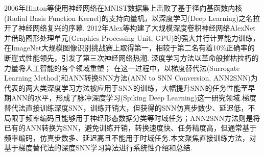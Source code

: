 \documentclass{SCIS2020cn}
\begin{document}
2006年Hinton等\cite{10.1162/neco.2006.18.7.1527}使用神经网络在MNIST数据集\cite{MNIST}上击败了基于径向基函数内核(Radial Basis Function Kernel)的支持向量机，以深度学习(Deep Learning)之名拉开了神经网络复兴的序幕\cite{Goodfellow-et-al-2016}.
2012年Alex等\cite{NIPS2012_c399862d}构建了大规模深度卷积神经网络AlexNet并借助图形处理单元(Graphics Processing Unit, GPU)的强大并行计算能力训练，在ImageNet大规模图像识别挑战赛\cite{russakovsky2015imagenet}上取得第一，相较于第二名有着10\%正确率的断崖式性能领先，引发了第三次神经网络热潮.
深度学习方法以革命般摧枯拉朽的力量将人工智能的各个领域重塑；%
在这一过程中，以梯度替代法(Surrogate Learning Method)\cite{neftci2019surrogate}和ANN转换SNN方法(ANN to SNN Conversion, ANN2SNN)\cite{cao2015spiking}为代表的两大类深度学习方法被应用于SNN的训练，大幅提升SNN的任务性能至早期ANN的水平\cite{TAVANAEI201947}，形成了脉冲深度学习(Spiking Deep Learning)这一研究领域.梯度替代法直接训练深度SNN，训练开销大，但获得的SNN仿真步数少、延迟低，不局限于频率编码且能够用于神经形态数据分类等时域任务；ANN2SNN方法则是将已有的ANN转换为SNN，避免训练开销，转换速度快、任务精度高，但通常基于频率编码，仿真步数多、延迟高且不能用于时域任务.本文聚焦直接训练方法，对基于梯度替代法的深度SNN学习算法进行系统性介绍和总结.


\begin{figure}[htbp]
	\centering
	\label{fig: timeline}
\end{figure}
\end{document}
